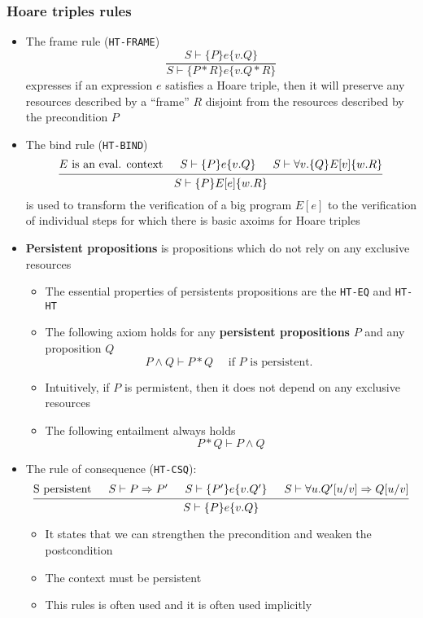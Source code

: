 \subsubsection{Hoare triples rules}
\begin{itemize}
  \item The frame rule (\texttt{HT-FRAME})
  \begin{equation*}
    \frac{S \vdash\{P\} e\{v . Q\}}{S \vdash\{P * R\} e\{v . Q * R\}}
  \end{equation*}
  expresses if an expression $e$ satisfies a Hoare triple, then it will preserve any resources described by a ``frame'' $R$ disjoint from the resources described by the precondition $P$
  \item The bind rule (\texttt{HT-BIND})
  \[
  \begin{prooftree} 
    \hypo{E\text{ is an eval. context}}
    \hypo{S \vdash \{P\} e \{v.Q\}}
    \hypo{S \vdash \forall v. \{Q\} E[v] \{w.R\}} 
    \infer3{S \vdash \{P\} E[e] \{w.R\}}
  \end{prooftree}
  \]
  is used to transform the verification of a big program $E[e]$ to the verification of individual steps for which there is basic axoims for Hoare triples
  \item \textbf{Persistent propositions} is propositions which do not rely on any exclusive resources
  \begin{itemize}
  	\item The essential properties of persistents propositions are the \texttt{HT-EQ} and \texttt{HT-HT}
  	\item The following axiom holds for any \textbf{persistent propositions} $P$ and any proposition $Q$
    \begin{equation*}
      P \wedge Q \vdash P * Q \quad \text { if } P \text { is persistent. }
    \end{equation*}
    \item Intuitively, if $P$ is permistent, then it does not depend on any exclusive resources
    \item The following entailment always holds
    \begin{equation*}
    P * Q \vdash P \land Q
    \end{equation*}
    \end{itemize}
  \item The rule of consequence (\texttt{HT-CSQ}):
  \[
  \begin{prooftree} 
    \hypo{\text{S persistent}}
    \hypo{S \vdash P \Rightarrow P'}
    \hypo{S \vdash \{P'\} e \{v.Q'\}}
    \hypo{S \vdash \forall u. Q'[u/v] \Rightarrow Q[u/v]} 
    \infer4{S \vdash \{P\} e \{v.Q\}}
  \end{prooftree}
  \]  
  \begin{itemize}
    \item It states that we can strengthen the precondition and weaken the postcondition
  	\item The context must be persistent
  	\item This rules is often used and it is often used implicitly
  \end{itemize}
\end{itemize}
